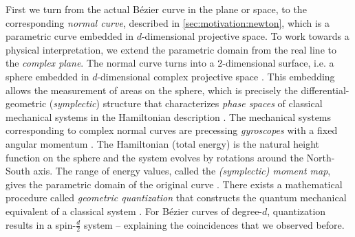 \documentclass[final,3p,mathptmx]{elsarticle}
\begin{document}
First we turn from the actual B\'{e}zier curve in the plane or space, to the corresponding \emph{normal curve}, described in \autoref{sec:motivation:newton}, which is a parametric curve embedded in $d$-dimensional projective space. To work towards a physical interpretation, we extend the parametric domain from the real line to the \emph{complex plane}. The normal curve turns into a 2-dimensional surface, i.e. a sphere embedded in $d$-dimensional complex projective space \cite[Ch. 6.3]{bengtsson2006geometry}. This embedding allows the measurement of areas on the sphere, which is precisely the differential-geometric (\emph{symplectic}) structure that characterizes \emph{phase spaces} of classical mechanical systems in the Hamiltonian description \cite{arnold1989mathematical,hand1998analytical,guillemin1984symplectic}. The mechanical systems corresponding to complex normal curves are precessing \emph{gyroscopes} with a fixed angular momentum \cite[Sec. 3]{stone1989supersymmetry}. The Hamiltonian (total energy) is the natural height function on the sphere and the system evolves by rotations around the North-South axis. The range of energy values, called the \emph{(symplectic) moment map}, gives the parametric domain of the original curve \cite{sottile2003toric,da2003symplectic}. There exists a mathematical procedure called \emph{geometric quantization} that constructs the quantum mechanical equivalent of a classical system \cite{blau1992symplectic,todorov2012quantization,woodhouse1997geometric,hall2013quantum}. For B\'{e}zier curves of degree-$d$, quantization results in a spin-$\frac{d}{2}$ system \cite{nlab2016geometric} -- explaining the coincidences that we observed before. 
\end{document}
